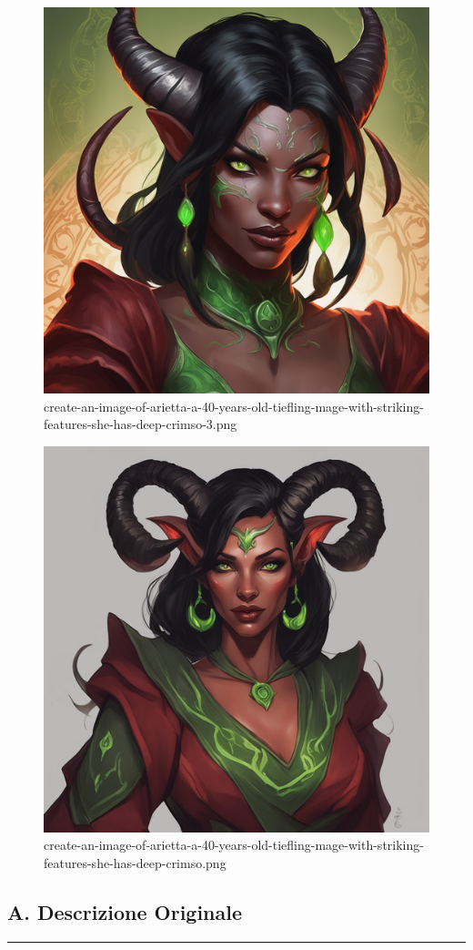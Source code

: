 \begin{figure}
\centering
\includegraphics{create-an-image-of-arietta-a-40-years-old-tiefling-mage-with-striking-features-she-has-deep-crimso-3.png}
\caption{create-an-image-of-arietta-a-40-years-old-tiefling-mage-with-striking-features-she-has-deep-crimso-3.png}
\end{figure}

\begin{figure}
\centering
\includegraphics{create-an-image-of-arietta-a-40-years-old-tiefling-mage-with-striking-features-she-has-deep-crimso.png}
\caption{create-an-image-of-arietta-a-40-years-old-tiefling-mage-with-striking-features-she-has-deep-crimso.png}
\end{figure}

\subsection{A. Descrizione Originale}\label{a.-descrizione-originale}

\begin{center}\rule{0.5\linewidth}{0.5pt}\end{center}
